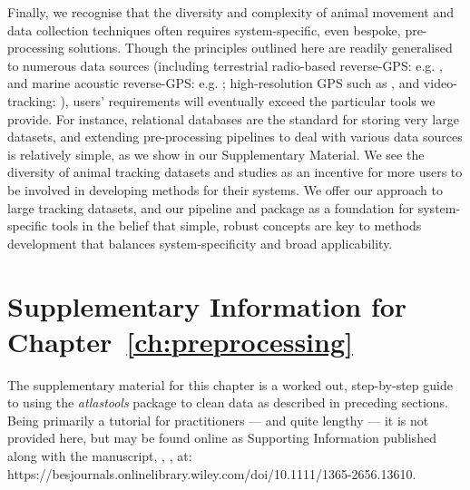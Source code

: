 Finally, we recognise that the diversity and complexity of animal movement and data collection techniques often requires system-specific, even bespoke, pre-processing solutions.
Though the principles outlined here are readily generalised to numerous data sources (including terrestrial radio-based reverse-GPS: e.g. \citealt{toledo2020}, and marine acoustic reverse-GPS: e.g. \citealt{aspillaga2021}; high-resolution GPS such as \citealt{strandburg-peshkin2015}, and video-tracking: \citealt{rathore2020}), users' requirements will eventually exceed the particular tools we provide.
For instance, relational databases are the standard for storing very large datasets, and extending pre-processing pipelines to deal with various data sources is relatively simple, as we show in our Supplementary Material.
We see the diversity of animal tracking datasets and studies as an incentive for more users to be involved in developing methods for their systems.
We offer our approach to large tracking datasets, and our pipeline and package as a foundation for system-specific tools in the belief that simple, robust concepts are key to methods development that balances system-specificity and broad applicability.\\
{ \begin{center}  \end{center} }



\begingroup

\let\clearpage\relax
\let\cleardoublepage\relax
\let\cleardoublepage\relax

{\chapter*{Supplementary Information for Chapter~\ref{ch:preprocessing}}}

The supplementary material for this chapter is a worked out, step-by-step guide to using the \emph{atlastools} package to clean data as described in preceding sections.
Being primarily a tutorial for practitioners --- and quite lengthy --- it is not provided here, but may be found online as Supporting Information published along with the manuscript, \textcite{gupte2022d}, , at:
https://besjournals.onlinelibrary.wiley.com/doi/10.1111/1365-2656.13610.

{ \begin{center}  \end{center} }

\endgroup

